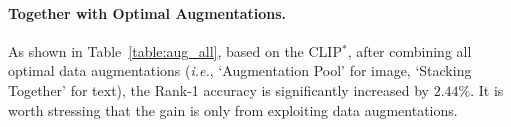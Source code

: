 \documentclass[letterpaper]{article} %
\begin{document}

\paragraph{Together with Optimal Augmentations.}
As shown in Table~\ref{table:aug_all}, based on the CLIP$^*$, after combining all optimal data augmentations (\emph{i.e.}, `Augmentation Pool' for image, `Stacking Together' for text), the Rank-1 accuracy is significantly increased by $2.44\%$.
It is worth stressing that the gain is only from exploiting data augmentations.
\end{document}
